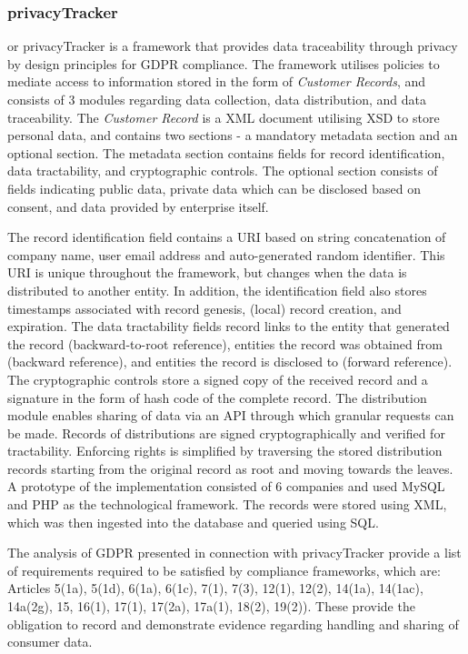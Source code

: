 \subsubsection{privacyTracker}
or privacyTracker \cite{gjermundrod_privacytracker:_2016} is a framework that provides data traceability through privacy by design principles for GDPR compliance. The framework utilises policies to mediate access to information stored in the form of \textit{Customer Records}, and consists of 3 modules regarding data collection, data distribution, and data traceability. The \textit{Customer Record} is a XML document utilising XSD to store personal data, and contains two sections - a mandatory metadata section and an optional section. The metadata section contains fields for record identification, data tractability, and cryptographic controls. The optional section consists of fields indicating public data, private data which can be disclosed based on consent, and data provided by enterprise itself.

The record identification field contains a URI based on string concatenation of company name, user email address and auto-generated random identifier. This URI is unique throughout the framework, but changes when the data is distributed to another entity. In addition, the identification field also stores timestamps associated with record genesis, (local) record creation, and expiration. The data tractability fields record links to the entity that generated the record (backward-to-root reference), entities the record was obtained from (backward reference), and entities the record is disclosed to (forward reference). The cryptographic controls store a signed copy of the received record and a signature in the form of hash code of the complete record.
The distribution module enables sharing of data via an API through which granular requests can be made. Records of distributions are signed cryptographically and verified for tractability.
Enforcing rights is simplified by traversing the stored distribution records starting from the original record as root and moving towards the leaves.
A prototype of the implementation consisted of 6 companies and used MySQL and PHP as the technological framework. The records were stored using XML, which was then ingested into the database and queried using SQL.

The analysis of GDPR presented in connection with privacyTracker provide a list of requirements required to be satisfied by compliance frameworks, which are: Articles 5(1a), 5(1d), 6(1a), 6(1c), 7(1), 7(3), 12(1), 12(2), 14(1a), 14(1ac), 14a(2g), 15, 16(1), 17(1), 17(2a), 17a(1), 18(2), 19(2)). These provide the obligation to record and demonstrate evidence regarding handling and sharing of consumer data. 

